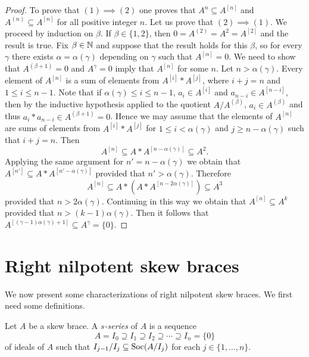 \begin{proof}
    To prove that $(1)\implies(2)$ one proves that $A^{n}\subseteq
    A^{[n]}$ and $A^{(n)}\subseteq A^{[n]}$
    for all positive integer $n$.
    Let us prove that
    $(2)\implies(1)$. We proceed by induction on $\beta$.  If
    $\beta\in\{1,2\}$, then $0=A^{(2)}=A^2=A^{[2]}$ and the result is true. Fix
    $\beta\in\mathbb{N}$ and suppose that the result holds for this $\beta$, so for
    every $\gamma$ there exists $\alpha=\alpha(\gamma)$ depending on $\gamma$
    such that $A^{[\alpha]}=0$.  We need to show that $A^{(\beta+1)}=0$ and
    $A^{\gamma}=0$ imply that $A^{[n]}$ for some $n$. Let $n>\alpha(\gamma)$.
    Every element of $A^{[n]}$ is a sum of elements from $A^{[i]}*A^{[j]}$,
    where $i+j=n$ and $1\leq i\leq n-1$. Note that if $\alpha(\gamma)\leq i\leq
    n-1$, $a_i\in A^{[i]}$ and $a_{n-i}\in A^{[n-i]}$, then by the inductive
    hypothesis applied to the quotient $A/A^{(\beta)}$, $a_i\in A^{(\beta)}$ and thus $a_i*a_{n-i}\in A^{(\beta
    +1)}=0$. Hence we may assume that the elements of $A^{[n]}$ are sums of
    elements from $A^{[i]}*A^{[j]}$ for $1\leq i<\alpha(\gamma)$ and $j\geq
    n-\alpha(\gamma)$ such that $i+j=n$. Then
    \[
    A^{[n]}\subseteq A*A^{[n-\alpha(\gamma)]}\subseteq A^2.
    \]
    Applying the same argument for $n'=n-\alpha(\gamma)$ we obtain that
    $A^{[n']}\subseteq A*A^{[n'-\alpha(\gamma)]}$ provided that
    $n'>\alpha(\gamma)$. Therefore
    \[
        A^{[n]}\subseteq A*(A*A^{[n-2\alpha(\gamma)]})\subseteq A^3
    \]
    provided that $n>2\alpha(\gamma)$. Continuing in this way we obtain that
    $A^{[n]}\subseteq A^{k}$
    provided that $n>(k-1)\alpha(\gamma)$.
    Then it follows that $A^{[(\gamma-1)\alpha(\gamma)+1]}\subseteq
    A^{\gamma}=\{0\}$.
\end{proof}

\section{Right nilpotent skew braces}

We now present some characterizations of right nilpotent skew braces. We first 
need some definitions.  

\begin{definition}
\label{defn:s-series}
    Let $A$ be a skew brace. A \emph{$s$-series} of $A$ is a sequence
    \[
        A=I_0\supseteq I_1\supseteq I_2\supseteq\cdots\supseteq I_n=\{0\}
    \]
    of ideals of $A$ such that $I_{j-1}/I_j\subseteq \operatorname{Soc}(A/I_j)$ for each
    $j\in\{1,\dots,n\}$.
\end{definition}

